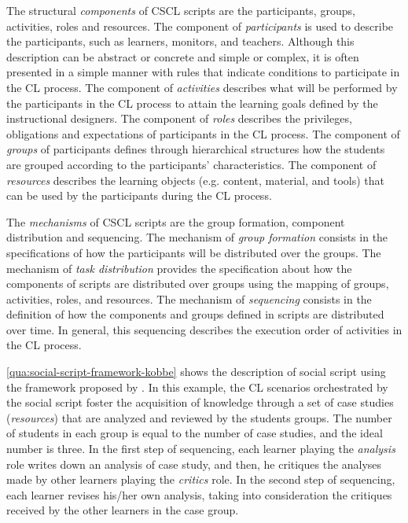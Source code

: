 The structural \emph{components} of CSCL scripts are the participants, groups, activities, roles and resources. The component of \emph{participants} is used to describe the participants, such as learners, monitors, and teachers. Although this description can be abstract or concrete and simple or complex, it is often presented in a simple manner with rules that indicate conditions to participate in the CL process. The component of \emph{activities} describes what will be performed by the participants in the CL process to attain the learning goals defined by the instructional designers. The component of \emph{roles} describes the privileges, obligations and expectations of participants in the CL process. The component of \emph{groups} of participants defines through hierarchical structures how the students are grouped according to the participants' characteristics. The component of \emph{resources} describes the learning objects (e.g. content, material, and tools) that can be used by the participants during the CL process.

The \emph{mechanisms} of CSCL scripts are the group formation, component distribution and sequencing. The mechanism of \emph{group formation} consists in the specifications of how the participants will be distributed over the groups. The mechanism of \emph{task distribution} provides the specification about how the components of scripts are distributed over groups using the mapping of groups, activities, roles, and resources. The mechanism of \emph{sequencing} consists in the definition of how the components and groups defined in scripts are distributed over time. In general, this sequencing describes the execution order of activities in the CL process.

\autoref{qua:social-script-framework-kobbe} shows the description of social script \cite{WeinbergerErtlFischerMandl2005} using the framework proposed by . In this example, the CL scenarios orchestrated by the social script foster the acquisition of knowledge through a set of case studies (\emph{resources}) that are analyzed and reviewed by the students groups. The number of students in each group is equal to the number of case studies, and the ideal number is three. In the first step of sequencing, each learner playing the \emph{analysis} role writes down an analysis of case study, and then, he critiques the analyses made by other learners playing the \emph{critics} role. In the second step of sequencing, each learner revises his/her own analysis, taking into consideration the critiques received by the other learners in the case group.

